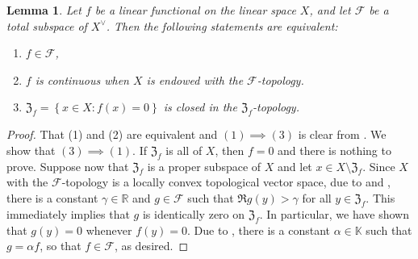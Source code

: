 \documentclass[11pt]{article}
\theoremstyle{thmstyle}
\newtheorem{lemma}[theorem]{Lemma}
\theoremstyle{defstyle}
\newcommand{\R}{\mathbb{R}}
\newcommand{\bbC}{\mathbb{C}}
\newcommand{\K}{\mathbb{K}} %
\newcommand{\scrF}{\mathscr F}
\begin{document}
\begin{lemma}
    Let $f$ be a linear functional on the linear space $X$, and let $\scrF$ be a total subspace of $X^{\vee}$. Then the following statements are equivalent: 
    \begin{enumerate}[label=(\arabic*)]
        \item $f\in\scrF$, 
        \item $f$ is continuous when $X$ is endowed with the $\scrF$-topology. 
        \item $\mathfrak{Z}_f = \left\{x\in X\colon f(x) = 0\right\}$ is closed in the $\mathfrak{Z}_f$-topology.
    \end{enumerate}
\end{lemma}
\begin{proof}
    That (1) and (2) are equivalent and $(1)\implies(3)$ is clear from . We show that $(3)\implies(1)$. If $\mathfrak{Z}_f$ is all of $X$, then $f = 0$ and there is nothing to prove. Suppose now that $\mathfrak{Z}_f$ is a proper subspace of $X$ and let $x\in X\setminus\mathfrak Z_f$. Since $X$ with the $\scrF$-topology is a locally convex topological vector space, due to  and , there is a constant $\gamma\in\R$ and $g\in\scrF$ such that $\Re g(y) > \gamma$ for all $y\in\mathfrak{Z}_f$. This immediately implies that $g$ is identically zero on $\mathfrak{Z}_f$. In particular, we have shown that $g(y) = 0$ whenever $f(y) = 0$. Due to , there is a constant $\alpha\in\K$ such that $g = \alpha f$, so that $f\in\scrF$, as desired.
\end{proof}
\end{document}

